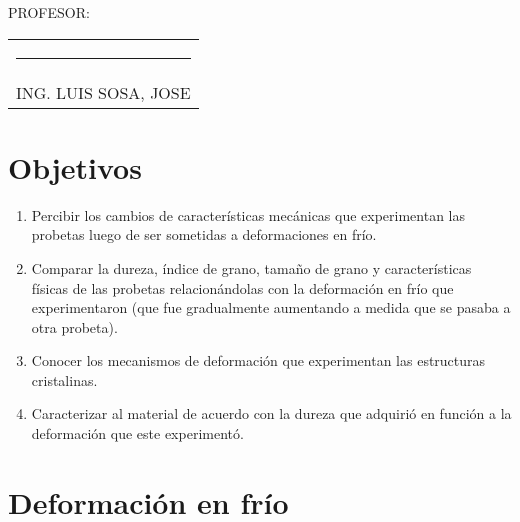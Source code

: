 \documentclass[a4paper,12pt]{report}
\begin{document}
{\large PROFESOR:} \\[1.15cm]
\begin{center}
\begin{tabular}{c}
\rule[3pt]{4.8in}{1pt}\\[1pt]
ING. LUIS SOSA, JOSE 
\end{tabular}
\end{center}
\vfill
\newpage
\tableofcontents
\listoffigures
{}
\chapter{Objetivos}
\begin{enumerate}
\item Percibir los cambios de características mecánicas que experimentan las probetas luego de ser sometidas a deformaciones en frío.
\item Comparar la dureza, índice de grano, tamaño de grano y características físicas de las probetas relacionándolas con la deformación en frío que experimentaron (que fue gradualmente aumentando a medida que se pasaba a otra probeta).
\item Conocer los mecanismos de deformación que experimentan las estructuras cristalinas. 
\item Caracterizar al material de acuerdo con la dureza que adquirió en función a la deformación que este experimentó. 
\end{enumerate}
\setcounter{page}{1}  %
\chapter{Deformación en frío}
\end{document}
